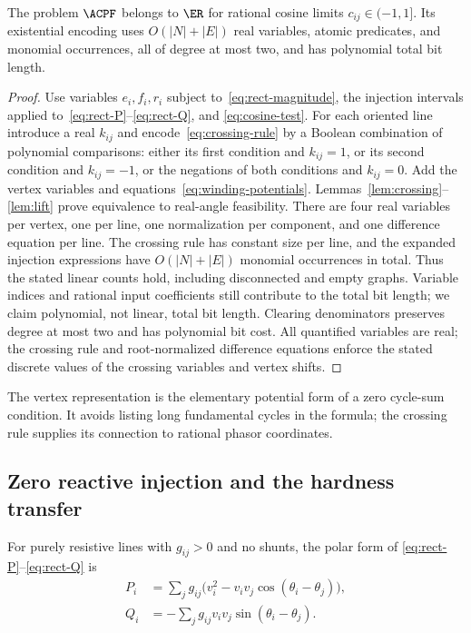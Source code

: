\begin{theorem}
\label{thm:ac-membership}
The problem $\ACPF$ belongs to $\ER$ for rational cosine limits
$c_{ij}\in(-1,1]$. Its existential encoding uses $O(|N|+|E|)$ real
variables, atomic predicates, and monomial occurrences, all of degree
at most two, and has polynomial total bit length.
\end{theorem}
\begin{proof}
Use variables $e_i,f_i,r_i$ subject to~\eqref{eq:rect-magnitude}, the injection
intervals applied to~\eqref{eq:rect-P}--\eqref{eq:rect-Q}, and
\eqref{eq:cosine-test}. For each oriented line introduce a real $k_{ij}$ and
encode~\eqref{eq:crossing-rule} by a Boolean combination of polynomial
comparisons: either its first condition and $k_{ij}=1$, or its second
condition and $k_{ij}=-1$, or the negations of both conditions and $k_{ij}=0$.
Add the vertex variables and equations~\eqref{eq:winding-potentials}.
Lemmas~\ref{lem:crossing}--\ref{lem:lift} prove equivalence to real-angle
feasibility. There are four real variables per vertex, one per line,
one normalization per component, and one difference equation per line.
The crossing rule has constant size per line, and the expanded injection
expressions have $O(|N|+|E|)$ monomial occurrences in total. Thus the
stated linear counts hold, including disconnected and empty graphs.
Variable indices and rational input coefficients still contribute to the
total bit length; we claim polynomial, not linear, total bit length.
Clearing denominators preserves degree at most two and has polynomial
bit cost. All quantified variables are real; the crossing rule and
root-normalized difference equations enforce the stated discrete values of
the crossing variables and vertex shifts.
\end{proof}

The vertex representation is the elementary potential form of a zero
cycle-sum condition. It avoids listing long fundamental cycles in the
formula; the crossing rule supplies its connection to rational phasor
coordinates.

\subsection{Zero reactive injection and the hardness transfer}

For purely resistive lines with $g_{ij}>0$ and no shunts, the polar form of
\eqref{eq:rect-P}--\eqref{eq:rect-Q} is
\begin{align}
 P_i&=\sum_j g_{ij}\bigl(v_i^2-v_iv_j\cos(\theta_i-\theta_j)\bigr),
 \label{eq:resistive-ac-P}\\
 Q_i&=-\sum_j g_{ij}v_iv_j\sin(\theta_i-\theta_j).
 \label{eq:resistive-ac-Q}
\end{align}

